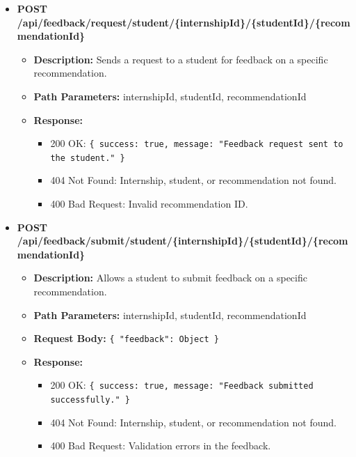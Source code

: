 \begin{itemize}
    \item \textbf{POST /api/feedback/request/student/\{internshipId\}/\{studentId\}/\{recommendationId\}}  
    \begin{itemize}
        \item \textbf{Description:} Sends a request to a student for feedback on a specific recommendation.
        \item \textbf{Path Parameters:} internshipId, studentId, recommendationId  
        \item \textbf{Response:}
        \begin{itemize}
            \item 200 OK: \texttt{\{ success: true, message: "Feedback request sent to the student." \}}
            \item 404 Not Found: Internship, student, or recommendation not found.
            \item 400 Bad Request: Invalid recommendation ID.
        \end{itemize}
    \end{itemize}


    \item \textbf{POST /api/feedback/submit/student/\{internshipId\}/\{studentId\}/\{recommendationId\}}  
    \begin{itemize}
        \item \textbf{Description:} Allows a student to submit feedback on a specific recommendation.
        \item \textbf{Path Parameters:} internshipId, studentId, recommendationId  
        \item \textbf{Request Body:} 
        \texttt{\{ 
            "feedback": Object
        \}}
        \item \textbf{Response:}
        \begin{itemize}
            \item 200 OK: \texttt{\{ success: true, message: "Feedback submitted successfully." \}}
            \item 404 Not Found: Internship, student, or recommendation not found.
            \item 400 Bad Request: Validation errors in the feedback.
        \end{itemize}
    \end{itemize}


\end{itemize}
